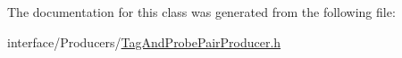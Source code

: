 The documentation for this class was generated from the following file:\begin{DoxyCompactItemize}
\item 
interface/Producers/\hyperlink{TagAndProbePairProducer_8h}{TagAndProbePairProducer.h}\end{DoxyCompactItemize}
